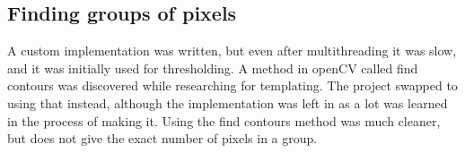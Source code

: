 \subsection{Finding groups of pixels}

A custom implementation was written, but even after multithreading it was slow, and it was initially used for thresholding. A method in openCV called find contours was discovered while researching for templating. The project swapped to using that instead, although the implementation was left in as a lot was learned in the process of making it. Using the find contours method was much cleaner, but does not give the exact number of pixels in a group.


